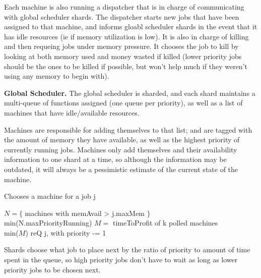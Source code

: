 Each machine is also running a dispatcher that is in charge of communicating
with global scheduler shards. The dispatcher starts new jobs that have been
assigned to that machine, and informs gloabl scheduler shards in the event that
it has idle resources (ie if memory utilization is low). It is also in charge of
killing and then requeing jobs under memory pressure. It chooses the job to kill
by looking at both memory used and money wasted if killed (lower priority jobs
should be the ones to be killed if possible, but won't help much if they weren't
using any memory to begin with).



\textbf{Global Scheduler.}
The global scheduler is sharded, and each shard maintains a multi-queue of
functions assigned (one queue per priority), as well as a list of machines that
have idle/available resources. 

Machines are responsible for adding themselves to that list; and are tagged with
the amount of memory they have available, as well as the highest priority of
currently running jobs. Machines only add themselves and their availability
information to one shard at a time, so although the information may be outdated,
it will always be a pessimistic estimate of the current state of the machine.

\begin{algorithm}[ht!]
\caption{Chooses a machine for a job j}\label{alg:place}
\begin{algorithmic}
    \State$N = \{ $ machines with memAvail > j.maxMem $\}$
     \\
        \Return$ $min(N.maxPriorityRunning)
    \EndIf
    \State$M = $ timeToProfit of k polled machines
     \\
        \Return$ $min($M$)
    \Else
        \State$ $reQ j, with priority -= 1
    \EndIf
\end{algorithmic}
\end{algorithm}

Shards choose what job to place next by the ratio of priority to amount of
time spent in the queue, so high priority jobs don't have to wait as long
as lower priority jobs to be chosen next. 

